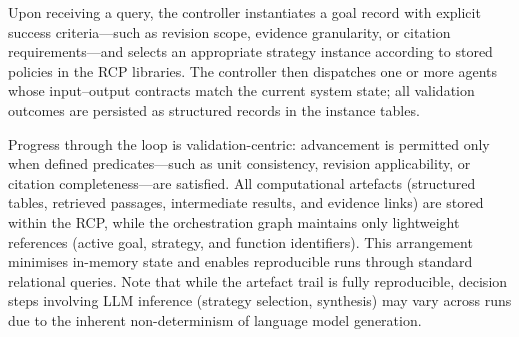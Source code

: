 \documentclass[largeformat]{interact}
\begin{document}

Upon receiving a query, the controller instantiates a goal record with explicit success criteria---such as revision scope, evidence granularity, or citation requirements---and selects an appropriate strategy instance according to stored policies in the RCP libraries. The controller then dispatches one or more agents whose input--output contracts match the current system state; all validation outcomes are persisted as structured records in the instance tables.

Progress through the loop is validation-centric: advancement is permitted only when defined predicates---such as unit consistency, revision applicability, or citation completeness---are satisfied. All computational artefacts (structured tables, retrieved passages, intermediate results, and evidence links) are stored within the RCP, while the orchestration graph maintains only lightweight references (active goal, strategy, and function identifiers). This arrangement minimises in-memory state and enables reproducible runs through standard relational queries. Note that while the artefact trail is fully reproducible, decision steps involving LLM inference (strategy selection, synthesis) may vary across runs due to the inherent non-determinism of language model generation.
\end{document}
